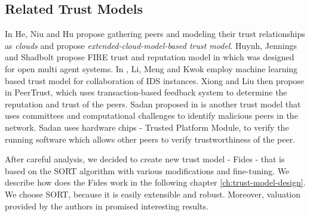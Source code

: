 \subsection{Related Trust Models}
\label{subsec:related-trust-models}
In \cite{1562680} He, Niu and Hu propose gathering peers and modeling their trust relationships as \textit{clouds} and propose \textit{extended-cloud-model-based trust model}.
Huynh, Jennings and Shadbolt propose FIRE trust and reputation model in \cite{huynh2006integrated} which was designed for open multi agent systems.
In \cite{li2014design}, Li, Meng and Kwok employ machine learning based trust model for collaboration of IDS instances.
Xiong and Liu then propose in \cite{xiong2004peertrust} PeerTrust, which uses transaction-based feedback system to determine the reputation and trust of the peers.
Sadan proposed in \cite{abera2019sadan} is another trust model that uses committees and computational challenges to identify malicious peers in the network.
Sadan uses hardware chips - Trusted Platform Module, to verify the running software which allows other peers to verify trustworthiness of the peer.

\vspace{1cm}

\noindent
After careful analysis, we decided to create new trust model - Fides - that is based on the SORT algorithm with various modifications and fine-tuning.
We describe how does the Fides work in the following chapter \ref{ch:trust-model-design}.
We choose SORT, because it is easily extensible and robust. 
Moreover, valuation provided by the authors in \cite{sort} promised interesting results.